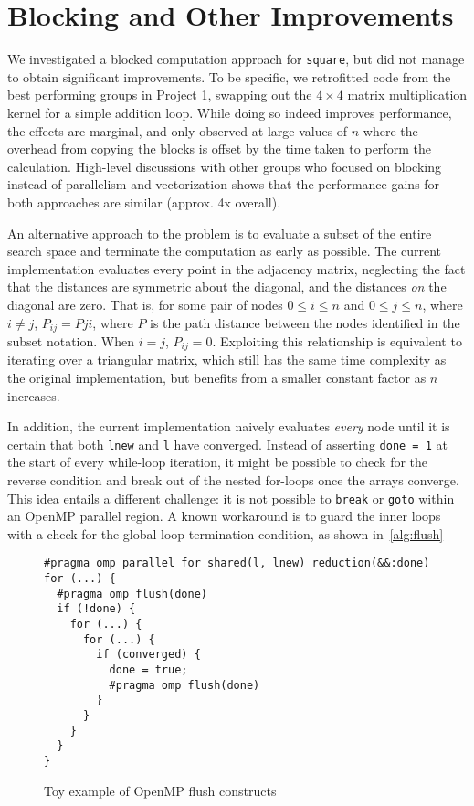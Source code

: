 \documentclass{scrartcl}
\begin{document}
  \section{Blocking and Other Improvements}
  We investigated a blocked computation approach for \texttt{square}, but did not manage to obtain significant improvements. To be specific, we retrofitted code from the best performing groups in Project 1, swapping out the $4 \times 4$ matrix multiplication kernel for a simple addition loop. While doing so indeed improves performance, the effects are marginal, and only observed at large values of $n$ where the overhead from copying the blocks is offset by the time taken to perform the calculation. High-level discussions with other groups who focused on blocking instead of parallelism and vectorization shows that the performance gains for both approaches are similar (approx. 4x overall).

  An alternative approach to the problem is to evaluate a subset of the entire search space and terminate the computation as early as possible. The current implementation evaluates every point in the adjacency matrix, neglecting the fact that the distances are symmetric about the diagonal, and the distances \emph{on} the diagonal are zero. That is, for some pair of nodes $0 \leq i \leq n$ and $0 \leq j \leq n$, where $i \neq j$, $P_{ij} = P{ji}$, where $P$ is the path distance between the nodes identified in the subset notation. When $i = j$, $P_{ij} = 0$. Exploiting this relationship is equivalent to iterating over a triangular matrix, which still has the same time complexity as the original implementation, but benefits from a smaller constant factor as $n$ increases.

  In addition, the current implementation naively evaluates \emph{every} node until it is certain that both \texttt{lnew} and \texttt{l} have converged. Instead of asserting \texttt{done = 1} at the start of every while-loop iteration, it might be possible to check for the reverse condition and break out of the nested for-loops once the arrays converge. This idea entails a different challenge: it is not possible to \texttt{break} or \texttt{goto} within an OpenMP parallel region. A known workaround is to guard the inner loops with a check for the global loop termination condition, as shown in~\autoref{alg:flush}
  \begin{figure}[ht!]
    \begin{lstlisting}
#pragma omp parallel for shared(l, lnew) reduction(&&:done)
for (...) {
  #pragma omp flush(done)
  if (!done) {
    for (...) {
      for (...) {
        if (converged) {
          done = true;
          #pragma omp flush(done)
        }
      }
    }
  }
}
    \end{lstlisting}
    \caption{Toy example of OpenMP flush constructs\label{alg:flush}}
  \end{figure}
\end{document}
